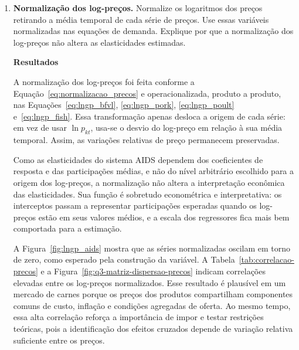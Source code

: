 \documentclass[12pt,a4paper]{article}
\begin{document}
\begin{enumerate}[label=\textbf{\arabic*.}]
A Tabela~\ref{tab:stone_index} e a Figura~\ref{fig:stone_real_aids} mostram diretamente a construção do índice de Stone e do dispêndio real. Já a Figura~\ref{fig:q2-dispendio-total-carnes} evidencia a trajetória nominal do gasto com carnes, enquanto a Figura~\ref{fig:q2-peso-carnes-pce} ilustra que esse gasto é apenas uma parcela do consumo agregado. Essa distinção é central: a lista estima uma demanda condicional por carnes, de modo que \(x_t\) deve ser interpretado como o dispêndio total no grupo de carnes, e não como a renda total do consumidor. Por isso, os coeficientes \(\beta_g\), posteriormente apresentados na Tabela~\ref{tab:beta-hsym}, medem como a composição do gasto com carnes muda quando o dispêndio real nesse grupo aumenta.

\item \textbf{Normalização dos log-preços.}
Normalize os logaritmos dos preços retirando a média temporal de cada série de preços. Use essas variáveis normalizadas nas equações de demanda. Explique por que a normalização dos log-preços não altera as elasticidades estimadas.

\textbf{Resultados}

A normalização dos log-preços foi feita conforme a Equação~\eqref{eq:normalizacao_precos} e operacionalizada, produto a produto, nas Equações~\eqref{eq:lngp_bfvl}, \eqref{eq:lngp_pork}, \eqref{eq:lngp_poult} e~\eqref{eq:lngp_fish}. Essa transformação apenas desloca a origem de cada série: em vez de usar \(\ln p_{kt}\), usa-se o desvio do log-preço em relação à sua média temporal. Assim, as variações relativas de preço permanecem preservadas.

Como as elasticidades do sistema AIDS dependem dos coeficientes de resposta e das participações médias, e não do nível arbitrário escolhido para a origem dos log-preços, a normalização não altera a interpretação econômica das elasticidades. Sua função é sobretudo econométrica e interpretativa: os interceptos passam a representar participações esperadas quando os log-preços estão em seus valores médios, e a escala dos regressores fica mais bem comportada para a estimação.



A Figura~\ref{fig:lngp_aids} mostra que as séries normalizadas oscilam em torno de zero, como esperado pela construção da variável. A Tabela~\ref{tab:correlacao-precos} e a Figura~\ref{fig:q3-matriz-dispersao-precos} indicam correlações elevadas entre os log-preços normalizados. Esse resultado é plausível em um mercado de carnes porque os preços dos produtos compartilham componentes comuns de custo, inflação e condições agregadas de oferta. Ao mesmo tempo, essa alta correlação reforça a importância de impor e testar restrições teóricas, pois a identificação dos efeitos cruzados depende de variação relativa suficiente entre os preços.


\end{enumerate}
\end{document}
